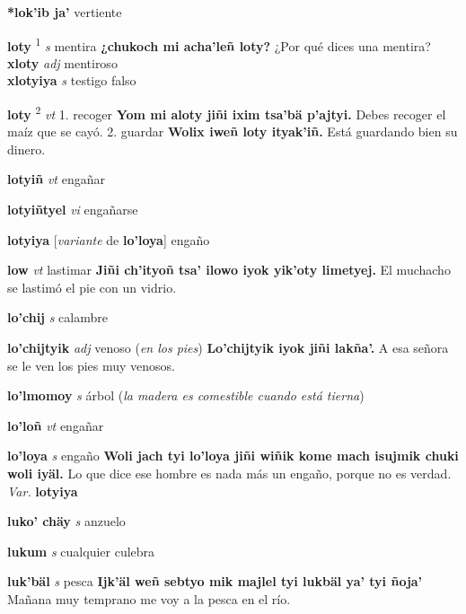 \documentclass[10pt]{scrbook}
\newcommand{\entry}[1]{\textbf{#1}}
\newcommand{\onedefinition}[1]{#1.}
\newcommand{\defsuperscript}[1]{\textsuperscript{#1}}
\newcommand{\partofspeech}[1]{\textit{#1}}
\newcommand{\spanishtranslation}[1]{#1}
\newcommand{\clarification}[1]{(\textit{#1})}
\newcommand{\cholexample}[1]{\textbf{#1}}
\newcommand{\exampletranslation}[1]{#1}
\newcommand{\secondaryentry}[1]{\\\textbf{#1}}
\newcommand{\secondpartofspeech}[1]{\textit{#1}}
\newcommand{\secondtranslation}[1]{#1}
\newcommand{\variation}[1]{\textit{Var.} \textbf{#1}}
\newcommand{\conjugationtense}[1]{[\textit{#1}}
\newcommand{\conjugationverb}[1]{de \textbf{#1}]}
\begin{document}
\begin{multicols}{2}
\entry{*lok'ib ja'}
\spanishtranslation{vertiente}

\entry{loty}
\defsuperscript{1}
\partofspeech{s}
\spanishtranslation{mentira}
\cholexample{¿chukoch mi acha'leñ loty?}
\exampletranslation{¿Por qué dices una mentira?}
\secondaryentry{xloty}
\secondpartofspeech{adj}
\secondtranslation{mentiroso}
\secondaryentry{xlotyiya}
\secondpartofspeech{s}
\secondtranslation{testigo falso}

\entry{loty}
\defsuperscript{2}
\partofspeech{vt}
\onedefinition{1}
\spanishtranslation{recoger}
\cholexample{Yom mi aloty jiñi ixim tsa'bä p'ajtyi.}
\exampletranslation{Debes recoger el maíz que se cayó.}
\onedefinition{2}
\spanishtranslation{guardar}
\cholexample{Wolix iweñ loty ityak'iñ.}
\exampletranslation{Está guardando bien su dinero.}

\entry{lotyiñ}
\partofspeech{vt}
\spanishtranslation{engañar}

\entry{lotyiñtyel}
\partofspeech{vi}
\spanishtranslation{engañarse}

\entry{lotyiya}
\conjugationtense{variante}
\conjugationverb{lo'loya}
\spanishtranslation{engaño}

\entry{low}
\partofspeech{vt}
\spanishtranslation{lastimar}
\cholexample{Jiñi ch'ityoñ tsa' ilowo iyok yik'oty limetyej.}
\exampletranslation{El muchacho se lastimó el pie con un vidrio.}

\entry{lo'chij}
\partofspeech{s}
\spanishtranslation{calambre}

\entry{lo'chijtyik}
\partofspeech{adj}
\spanishtranslation{venoso}
\clarification{en los pies}
\cholexample{Lo'chijtyik iyok jiñi lakña'.}
\exampletranslation{A esa señora se le ven los pies muy venosos.}

\entry{lo'lmomoy}
\partofspeech{s}
\spanishtranslation{árbol}
\clarification{la madera es comestible cuando está tierna}

\entry{lo'loñ}
\partofspeech{vt}
\spanishtranslation{engañar}

\entry{lo'loya}
\partofspeech{s}
\spanishtranslation{engaño}
\cholexample{Woli jach tyi lo'loya jiñi wiñik kome mach isujmik chuki woli iyäl.}
\exampletranslation{Lo que dice ese hombre es nada más un engaño, porque no es verdad.}
\variation{lotyiya}

\entry{luko' chäy}
\partofspeech{s}
\spanishtranslation{anzuelo}

\entry{lukum}
\partofspeech{s}
\spanishtranslation{cualquier culebra}

\entry{luk'bäl}
\partofspeech{s}
\spanishtranslation{pesca}
\cholexample{Ijk'äl weñ sebtyo mik majlel tyi lukbäl ya' tyi ñoja'}
\exampletranslation{Mañana muy temprano me voy a la pesca en el río.}


\end{multicols}
\end{document}
